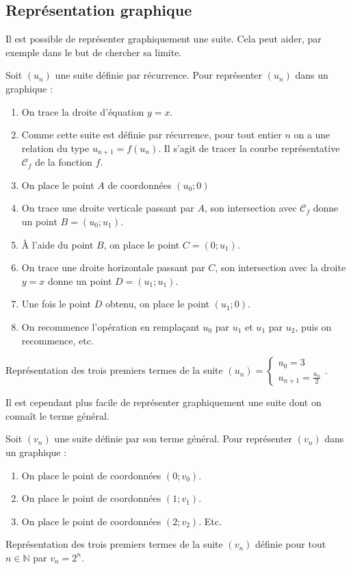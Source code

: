 	\subsection{Représentation graphique}

	Il est possible de représenter graphiquement une suite. Cela peut aider, par exemple dans le but de chercher sa limite.

	\begin{formula}
		Soit $(u_n)$ une suite définie par récurrence. Pour représenter $(u_n)$ dans un graphique :
		\begin{enumerate}
			\item On trace la droite d'équation $y = x$.
			\item  Comme cette suite est définie par récurrence, pour tout entier $n$ on a une relation du type $u_{n+1} = f(u_n)$. Il s'agit de tracer la courbe représentative $\mathcal{C}_f$ de la fonction $f$.
			\item On place le point $A$ de coordonnées $(u_0; 0)$
			\item On trace une droite verticale passant par $A$, son intersection avec $\mathcal{C}_f$ donne un point $B = (u_0; u_1)$.
			\item À l'aide du point $B$, on place le point $C = (0; u_1)$.
			\item On trace une droite horizontale passant par $C$, son intersection avec la droite $y = x$ donne un point $D = (u_1; u_1)$.
			\item Une fois le point $D$ obtenu, on place le point $(u_1; 0)$.
			\item On recommence l'opération en remplaçant $u_0$ par $u_1$ et $u_1$ par $u_2$, puis on recommence, etc.
		\end{enumerate}
	\end{formula}

	\begin{tip}[Exemple]
		Représentation des trois premiers termes de la suite $(u_n) = \begin{cases} u_0 = 3 \\ u_{n+1} = \frac{u_n}{2} \end{cases}$.
	\end{tip}

	Il est cependant plus facile de représenter graphiquement une suite dont on connaît le terme général.

	\begin{formula}
		Soit $(v_n)$ une suite définie par son terme général. Pour représenter $(v_n)$ dans un graphique :
		\begin{enumerate}
			\item On place le point de coordonnées $(0; v_0)$.
			\item On place le point de coordonnées $(1; v_1)$.
			\item On place le point de coordonnées $(2; v_2)$. Etc.
		\end{enumerate}
	\end{formula}

	\begin{tip}[Exemple]
		Représentation des trois premiers termes de la suite $(v_n)$ définie pour tout $n \in \mathbb{N}$ par $v_n = 2^n$.
	\end{tip}

